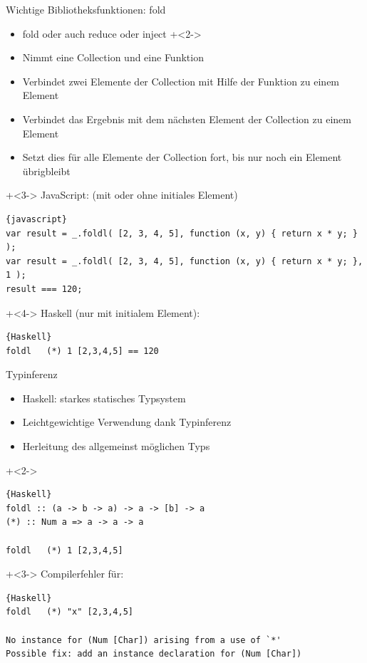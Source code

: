 \begin{frame}[fragile]{Wichtige Bibliotheksfunktionen: fold}
\begin{itemize}
\item fold oder auch reduce oder inject
\onslide+<2->
\item Nimmt eine Collection und eine Funktion
\item Verbindet zwei Elemente der Collection mit Hilfe der Funktion zu einem Element
\item Verbindet das Ergebnis mit dem nächsten Element der Collection zu einem Element
\item Setzt dies für alle Elemente der Collection fort, bis nur noch ein Element übrigbleibt
\end{itemize}

\onslide+<3->
JavaScript: (mit oder ohne initiales Element)
\begin{lstlisting}{javascript}
var result = _.foldl( [2, 3, 4, 5], function (x, y) { return x * y; } );
var result = _.foldl( [2, 3, 4, 5], function (x, y) { return x * y; }, 1 );
result === 120;
\end{lstlisting}
\onslide+<4->
Haskell (nur mit initialem Element):
\begin{lstlisting}{Haskell}
foldl	(*) 1 [2,3,4,5] == 120
\end{lstlisting}

\end{frame}

\begin{frame}[fragile]{Typinferenz}
\begin{itemize}
\item Haskell: starkes statisches Typsystem
\item Leichtgewichtige Verwendung dank Typinferenz
\item Herleitung des allgemeinst möglichen Typs
\end{itemize}

\onslide+<2->
\begin{lstlisting}{Haskell}
foldl :: (a -> b -> a) -> a -> [b] -> a
(*) :: Num a => a -> a -> a

foldl	(*) 1 [2,3,4,5]
\end{lstlisting}

\vfill

\onslide+<3->
Compilerfehler für:
\begin{lstlisting}{Haskell}
foldl	(*) "x" [2,3,4,5]

No instance for (Num [Char]) arising from a use of `*'
Possible fix: add an instance declaration for (Num [Char])
\end{lstlisting}

\end{frame}


